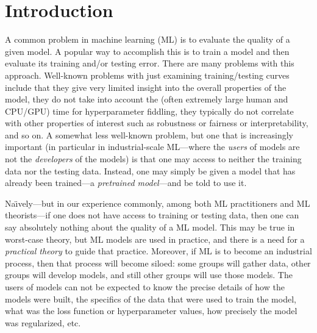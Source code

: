 
\section{Introduction}
\label{sxn:intro}

A common problem in machine learning (ML) 
is to evaluate the quality of a given model.
A popular way to accomplish this
is to train a model and then evaluate its training and/or testing error.
There are many problems with this approach.
Well-known problems with just examining training/testing curves include that 
they give very limited insight into the overall properties of the model, 
they do not take into account the (often extremely large human and CPU/GPU) time for hyperparameter fiddling,
they typically do not correlate with other properties of interest such as robustness or fairness or interpretability, 
and so on.
A somewhat less well-known problem, but one that is increasingly important (in particular in industrial-scale ML---where the \emph{users} of models are not the \emph{developers} of the models) is that one may access to neither the training data nor the testing data.
Instead, one may simply be given a model that has already been trained---a \emph{pretrained model}---and be told to use it.

Na\"{\i}vely---but in our experience commonly, among both ML practitioners and ML theorists---if one does not have access to training or testing data, then one can say absolutely nothing about the quality of a ML model.
This may be true in worst-case theory, but ML models are used in practice, and there is a need for a \emph{practical theory} to guide that practice.
Moreover, if ML is to become an industrial process, then that process will become siloed: some groups will gather data, other groups will develop models, and still other groups will use those models.
The users of models can not be expected to know the precise details of how the models were built, the specifics of the data that were used to train the model, what was the loss function or hyperparameter values, how precisely the model was regularized, etc.
%

